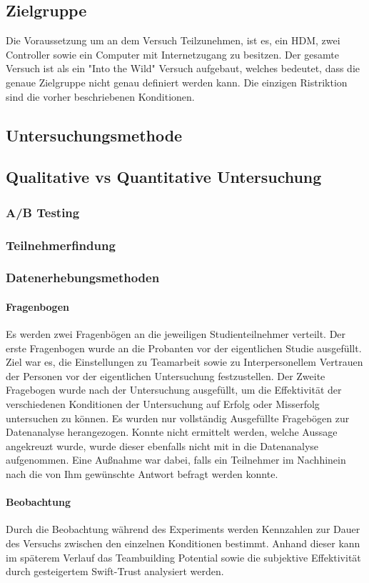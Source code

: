 \documentclass[a4paper,11pt]{article}%
\renewcommand{\\}{\vspace*{0.5\baselineskip} \newline}
\begin{document}
{		\subsection{Zielgruppe}
		Die Voraussetzung um an dem Versuch Teilzunehmen, ist es, ein \ac{HDM}, zwei Controller sowie ein Computer mit Internetzugang zu besitzen. Der gesamte Versuch ist als ein "Into the Wild" Versuch aufgebaut, welches bedeutet, dass die genaue Zielgruppe nicht genau definiert werden kann. Die einzigen Ristriktion sind die vorher beschriebenen Konditionen. 
		\subsection{Untersuchungsmethode}
			\subsection{Qualitative vs Quantitative Untersuchung}
			\subsubsection{A/B Testing}
			\subsubsection{Teilnehmerfindung}
			\subsubsection{Datenerhebungsmethoden}
				\paragraph{Fragenbogen}
				Es werden zwei Fragenbögen an die jeweiligen Studienteilnehmer verteilt. Der erste Fragenbogen wurde an die Probanten vor der eigentlichen Studie ausgefüllt. Ziel war es, die Einstellungen zu Teamarbeit sowie zu Interpersonellem Vertrauen der Personen vor der eigentlichen Untersuchung festzustellen. Der Zweite Fragebogen wurde nach der Untersuchung ausgefüllt, um die Effektivität der verschiedenen Konditionen der Untersuchung auf Erfolg oder Misserfolg untersuchen zu können.
				Es wurden nur vollständig Ausgefüllte Fragebögen zur Datenanalyse herangezogen. Konnte nicht ermittelt werden, welche Aussage angekreuzt wurde, wurde dieser ebenfalls nicht mit in die Datenanalyse aufgenommen. Eine Außnahme war dabei, falls ein Teilnehmer im Nachhinein nach die von Ihm gewünschte Antwort befragt werden konnte.
				\paragraph{Beobachtung}
				Durch die Beobachtung während des Experiments werden Kennzahlen zur Dauer des Versuchs zwischen den einzelnen Konditionen bestimmt. Anhand dieser kann im späterem Verlauf das  Teambuilding Potential sowie die subjektive Effektivität durch gesteigertem Swift-Trust analysiert werden.
}
\end{document}
